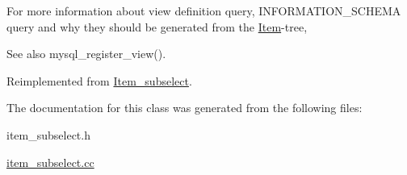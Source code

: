 For more information about view definition query, I\+N\+F\+O\+R\+M\+A\+T\+I\+O\+N\+\_\+\+S\+C\+H\+E\+MA query and why they should be generated from the \mbox{\hyperlink{classItem}{Item}}-\/tree, \begin{DoxySeeAlso}{See also}
mysql\+\_\+register\+\_\+view(). 
\end{DoxySeeAlso}


Reimplemented from \mbox{\hyperlink{classItem__subselect_a61f70e7dc36e3aad77919971995cccb9}{Item\+\_\+subselect}}.



The documentation for this class was generated from the following files\+:\begin{DoxyCompactItemize}
\item 
item\+\_\+subselect.\+h\item 
\mbox{\hyperlink{item__subselect_8cc}{item\+\_\+subselect.\+cc}}\end{DoxyCompactItemize}
